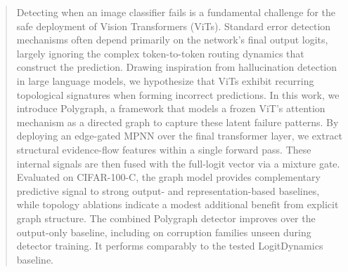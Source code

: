 \documentclass[11pt]{article}
\begin{document}
\begin{abstract}
Detecting when an image classifier fails is a fundamental challenge for the safe deployment of Vision Transformers (ViTs). Standard error detection mechanisms often depend primarily on the network's final output logits, largely ignoring the complex token-to-token routing dynamics that construct the prediction. Drawing inspiration from hallucination detection in large language models, we hypothesize that ViTs exhibit recurring topological signatures when forming incorrect predictions. In this work, we introduce Polygraph, a framework that models a frozen ViT's attention mechanism as a directed graph to capture these latent failure patterns. By deploying an edge-gated MPNN over the final transformer layer, we extract structural evidence-flow features within a single forward pass. These internal signals are then fused with the full-logit vector via a mixture gate. Evaluated on CIFAR-100-C, the graph model provides complementary predictive signal to strong output- and representation-based baselines, while topology ablations indicate a modest additional benefit from explicit graph structure. The combined Polygraph detector improves over the output-only baseline, including on corruption families unseen during detector training. It performs comparably to the tested LogitDynamics baseline.
\end{abstract}
\end{document}
